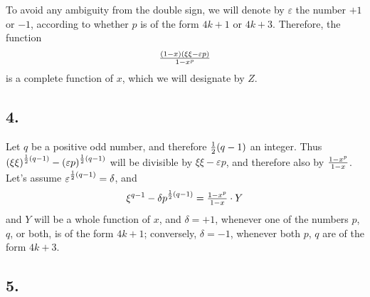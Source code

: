 \documentclass[twoside,12pt, showframe]{memoir}
\let\oldfrac\frac
\def\frac#1#2{\mathchoice{\tfrac{#1}{#2}}{\oldfrac{#1}{#2}}{\genfrac{}{}{}{2}{#1}{#2\mathstrut}}{\genfrac{}{}{}{3}{#1}{#2\mathstrut}}}
\begin{document}
To avoid any ambiguity from the double sign, we will denote by \(\varepsilon\) the number \(+1\) or \(-1\), according to whether \(p\) is of the form \(4k+1\) or \(4k+3\). Therefore, the function
\[\frac{(1-x)(\xi \xi-\varepsilon p)}{1-x^{p}}\]
is a complete function of \(x\), which we will designate by \(Z\).
%

\subsection*{4.}

Let \(q\) be a positive odd number, and therefore \(\frac{1}{2}(q-1)\) an integer. Thus \((\xi \xi)^{\frac{1}{2}(q-1)}-(\varepsilon p)^{\frac{1}{2}(q-1)}\) will be divisible by \(\xi \xi-\varepsilon p\), and therefore also by \(\frac{1-x^{p}}{1-x}\). Let's assume \(\varepsilon^{\frac{1}{2}(q-1)}=\delta\), and
\[\xi^{q-1}-\delta p^{\frac{1}{2}(q-1)}=\frac{1-x^{p}}{1-x} \cdot Y\]
and \(Y\) will be a whole function of \(x\), and \(\delta=+1\), whenever one of the numbers \(p\), \(q\), or both, is of the form \(4k+1\); conversely, \(\delta=-1\), whenever both \(p\), \(q\) are of the form \(4k+3\).
%

\subsection*{5.}
\end{document}
